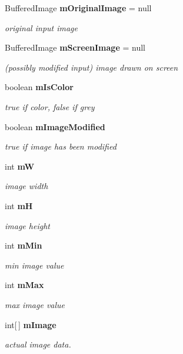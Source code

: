 \begin{CompactItemize}
\item 
Buffered\-Image {\bf m\-Original\-Image} = null
\begin{CompactList}\small\item\em original input image \item\end{CompactList}\item 
Buffered\-Image {\bf m\-Screen\-Image} = null
\begin{CompactList}\small\item\em (possibly modified input) image drawn on screen \item\end{CompactList}\item 
boolean {\bf m\-Is\-Color}
\begin{CompactList}\small\item\em true if color, false if grey \item\end{CompactList}\item 
boolean {\bf m\-Image\-Modified}
\begin{CompactList}\small\item\em true if image has been modified \item\end{CompactList}\item 
int {\bf m\-W}
\begin{CompactList}\small\item\em image width \item\end{CompactList}\item 
int {\bf m\-H}
\begin{CompactList}\small\item\em image height \item\end{CompactList}\item 
int {\bf m\-Min}
\begin{CompactList}\small\item\em min image value \item\end{CompactList}\item 
int {\bf m\-Max}
\begin{CompactList}\small\item\em max image value \item\end{CompactList}\item 
int[$\,$] {\bf m\-Image}
\begin{CompactList}\small\item\em actual image data. \item\end{CompactList}\end{CompactItemize}


